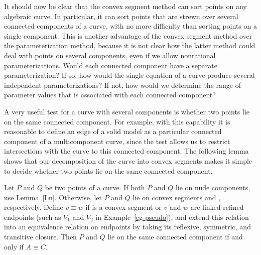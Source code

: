 It should now be clear that the convex segment method can sort points on any
algebraic curve.
In particular, it can sort points that are strewn over several connected 
components of a curve, with no more difficulty than sorting points on a single
component.
This is another advantage of the convex segment method over the parameterization
method, because it is not clear how the latter method could deal with points
on several components, even if we allow nonrational parameterizations.
%
%
Would each connected component have a separate parameterization?
If so, how would the single equation of a curve produce several independent 
parameterizations?
If not, how would we determine the range of parameter values that is associated 
with each connected component?

A very useful test for a curve with several components is whether two points 
lie on the same connected component.
For example, with this capability it is reasonable to define an edge of a solid model 
as a particular connected component of a multicomponent curve, since the test allows 
us to restrict intersections with the curve to this connected component.
The following lemma shows that our decomposition of 
the curve into convex segments makes it simple to decide whether two points lie on
the same connected component.

\begin{lemma}
Let $P$ and $Q$ be two points of a curve.
If both $P$ and $Q$ lie on nude components, use Lemma~{\rm\ref{Ln}}.
Otherwise, let $P$ and $Q$ lie on convex segments  and , respectively.
Define $v \equiv w$ if  is a convex segment 
or $v$ and $w$ are linked refined endpoints {\rm (}such as $V_{1}$ and $V_{2}$ in 
Example~{\rm\ref{eg-pseudo})}, and extend this relation into an equivalence relation 
on endpoints by taking its reflexive, symmetric, and transitive closure.
Then $P$ and $Q$ lie on the same connected component if and only if $A \equiv C$.
\end{lemma}

